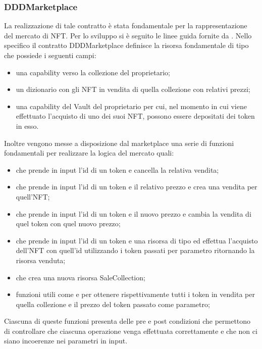 \subsubsection{DDDMarketplace}
La realizzazione di tale contratto è  stata fondamentale per la rappresentazione del mercato di NFT. Per lo sviluppo si è seguito le linee guida fornite da \cite{web:marketplace}. Nello specifico il contratto DDDMarketplace definisce la risorsa fondamentale di tipo  che possiede i seguenti campi:
\begin{itemize}
    \item una capability verso la collezione del proprietario;
    \item un dizionario con gli NFT in vendita di quella collezione con relativi prezzi;
    \item una capability del Vault del proprietario per cui, nel momento in cui viene effettuato l'acquisto di uno dei suoi NFT, possono essere depositati dei token in esso.
\end{itemize}
Inoltre vengono messe a disposizione dal marketplace una serie di funzioni fondamentali per realizzare la logica del mercato quali:
\begin{itemize}
    \item {} che prende in input l'id di un token e cancella la relativa vendita;
    \item {} che prende in input l'id di un token e il relativo prezzo e crea una vendita per quell'NFT;
    \item {} che prende in input l'id di un token e il nuovo prezzo e cambia la vendita di quel token con quel nuovo prezzo;
    \item {} che prende in input l'id di un token e una risorsa di tipo  ed effettua l'acquisto dell'NFT con quell'id utilizzando i token passati per parametro ritornando la risorsa venduta;
    \item {} che crea una nuova risorsa SaleCollection;
    \item funzioni utili come  e  per ottenere rispettivamente tutti i token in vendita per quella collezione e il prezzo del token passato come parametro;
\end{itemize}
Ciascuna di queste funzioni presenta delle pre e post condizioni che permettono di controllare che ciascuna operazione venga effettuata correttamente e che non ci siano incoerenze nei parametri in input.

